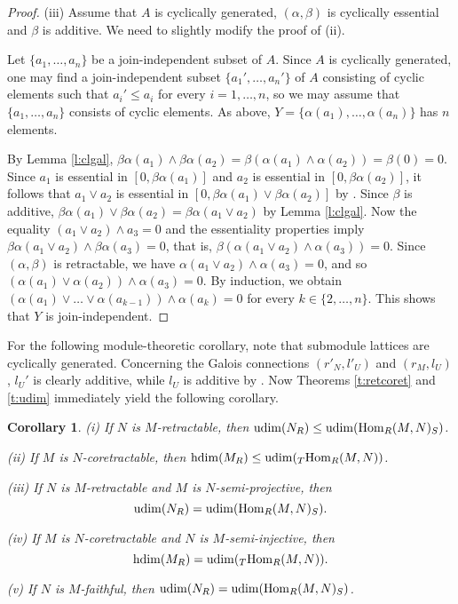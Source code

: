\documentclass[11pt,a4paper]{amsart}
\newtheorem{cor}[theorem]{Corollary}
\begin{document}
\begin{proof}
(iii) Assume that $A$ is cyclically generated, $(\alpha,\beta)$ is cyclically essential and $\beta$ is additive. We need
to slightly modify the proof of (ii). 

Let $\{a_1,\dots,a_n\}$ be a join-independent subset of $A$. Since $A$ is cyclically generated, one may find a
join-independent subset $\{a_1',\dots,a_n'\}$ of $A$ consisting of cyclic elements such that $a_i'\leq a_i$ for every
$i=1,\dots,n$, so we may assume that $\{a_1,\dots,a_n\}$ consists of cyclic elements. As above,
$Y=\{\alpha(a_1),\dots,\alpha(a_n)\}$ has $n$ elements. 

By Lemma \ref{l:clgal}, $\beta\alpha(a_1)\wedge \beta\alpha(a_2)=\beta(\alpha(a_1)\wedge \alpha(a_2))=\beta(0)=0$. Since
$a_1$ is essential in $[0,\beta\alpha(a_1)]$ and $a_2$ is essential in $[0,\beta\alpha(a_2)]$, it follows that $a_1\vee
a_2$ is essential in $[0,\beta\alpha(a_1)\vee \beta\alpha(a_2)]$ by \cite[Lemma~3]{GP}. Since $\beta$ is additive,
$\beta\alpha(a_1)\vee \beta\alpha(a_2)=\beta\alpha(a_1\vee a_2)$ by Lemma \ref{l:clgal}. Now the equality $(a_1\vee
a_2)\wedge a_3=0$ and the essentiality properties imply $\beta\alpha(a_1\vee a_2)\wedge \beta\alpha(a_3)=0$, that is,
$\beta(\alpha(a_1\vee a_2)\wedge \alpha(a_3))=0$. Since $(\alpha,\beta)$ is retractable, we have $\alpha(a_1\vee
a_2)\wedge \alpha(a_3)=0$, and so $(\alpha(a_1)\vee \alpha(a_2))\wedge \alpha(a_3)=0$. By induction, we obtain  
$(\alpha(a_1)\vee \ldots \vee \alpha(a_{k-1}))\wedge \alpha(a_k)=0$ for every $k\in \{2,\dots,n\}$. This shows that $Y$
is join-independent.
\end{proof}

For the following module-theoretic corollary, note that submodule lattices are cyclically generated. Concerning the
Galois connections $(r'_N,l'_U)$ and $(r_M,l_U)$, $l_U'$ is clearly additive, while $l_U$ is additive by
\cite[Lemma~4.9]{AES}. Now Theorems \ref{t:retcoret} and \ref{t:udim} immediately yield the following corollary. 

\begin{cor} \label{c:uhdim} (i) If $N$ is $M$-retractable, then ${\rm udim}(N_R)\leq {\rm
udim}({{\rm Hom}}_R(M,N)_S)$. 

(ii) If $M$ is $N$-coretractable, then ${\rm hdim}(M_R)\leq {\rm udim}({}_T{{\rm Hom}}_R(M,N))$.

(iii) If $N$ is $M$-retractable and $M$ is $N$-semi-projective, then $${\rm udim}(N_R)={\rm
udim}({{\rm Hom}}_R(M,N)_S).$$

(iv) If $M$ is $N$-coretractable and $N$ is $M$-semi-injective, then $${\rm hdim}(M_R)={\rm udim}({}_T{{\rm Hom}}_R(M,N)).$$

(v) If $N$ is $M$-faithful, then ${\rm udim}(N_R)={\rm udim}({{\rm Hom}}_R(M,N)_S)$.
\end{cor}
\end{document}

